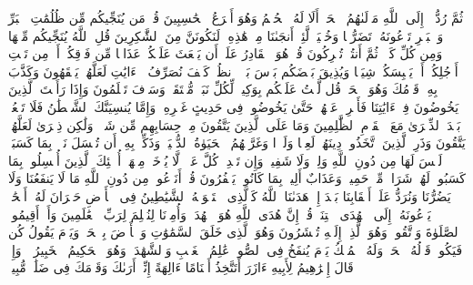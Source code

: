 \startbuffer[\q:6:62]
ثُمَّ رُدُّوۤا۟ إِلَى ٱللَّهِ مَوۡلَىٰهُمُ ٱلۡحَقِّۚ أَلَا لَهُ ٱلۡحُكۡمُ وَهُوَ أَسۡرَعُ ٱلۡحَٰسِبِینَ%
\stopbuffer
\startbuffer[\q:6:63]
قُلۡ مَن یُنَجِّیكُم مِّن ظُلُمَٰتِ ٱلۡبَرِّ وَٱلۡبَحۡرِ تَدۡعُونَهُۥ تَضَرُّعࣰا وَخُفۡیَةࣰ لَّئِنۡ أَنجَىٰنَا مِنۡ هَٰذِهِۦ لَنَكُونَنَّ مِنَ ٱلشَّٰكِرِینَ%
\stopbuffer
\startbuffer[\q:6:64]
قُلِ ٱللَّهُ یُنَجِّیكُم مِّنۡهَا وَمِن كُلِّ كَرۡبࣲ ثُمَّ أَنتُمۡ تُشۡرِكُونَ%
\stopbuffer
\startbuffer[\q:6:65]
قُلۡ هُوَ ٱلۡقَادِرُ عَلَىٰۤ أَن یَبۡعَثَ عَلَیۡكُمۡ عَذَابࣰا مِّن فَوۡقِكُمۡ أَوۡ مِن تَحۡتِ أَرۡجُلِكُمۡ أَوۡ یَلۡبِسَكُمۡ شِیَعࣰا وَیُذِیقَ بَعۡضَكُم بَأۡسَ بَعۡضٍۗ ٱنظُرۡ كَیۡفَ نُصَرِّفُ ٱلۡءَایَٰتِ لَعَلَّهُمۡ یَفۡقَهُونَ%
\stopbuffer
\startbuffer[\q:6:66]
وَكَذَّبَ بِهِۦ قَوۡمُكَ وَهُوَ ٱلۡحَقُّۚ قُل لَّسۡتُ عَلَیۡكُم بِوَكِیلࣲ%
\stopbuffer
\startbuffer[\q:6:67]
لِّكُلِّ نَبَإࣲ مُّسۡتَقَرࣱّۚ وَسَوۡفَ تَعۡلَمُونَ%
\stopbuffer
\startbuffer[\q:6:68]
وَإِذَا رَأَیۡتَ ٱلَّذِینَ یَخُوضُونَ فِیۤ ءَایَٰتِنَا فَأَعۡرِضۡ عَنۡهُمۡ حَتَّىٰ یَخُوضُوا۟ فِی حَدِیثٍ غَیۡرِهِۦۚ وَإِمَّا یُنسِیَنَّكَ ٱلشَّیۡطَٰنُ فَلَا تَقۡعُدۡ بَعۡدَ ٱلذِّكۡرَىٰ مَعَ ٱلۡقَوۡمِ ٱلظَّٰلِمِینَ%
\stopbuffer
\startbuffer[\q:6:69]
وَمَا عَلَى ٱلَّذِینَ یَتَّقُونَ مِنۡ حِسَابِهِم مِّن شَیۡءࣲ وَلَٰكِن ذِكۡرَىٰ لَعَلَّهُمۡ یَتَّقُونَ%
\stopbuffer
\startbuffer[\q:6:70]
وَذَرِ ٱلَّذِینَ ٱتَّخَذُوا۟ دِینَهُمۡ لَعِبࣰا وَلَهۡوࣰا وَغَرَّتۡهُمُ ٱلۡحَیَوٰةُ ٱلدُّنۡیَاۚ وَذَكِّرۡ بِهِۦۤ أَن تُبۡسَلَ نَفۡسُۢ بِمَا كَسَبَتۡ لَیۡسَ لَهَا مِن دُونِ ٱللَّهِ وَلِیࣱّ وَلَا شَفِیعࣱ وَإِن تَعۡدِلۡ كُلَّ عَدۡلࣲ لَّا یُؤۡخَذۡ مِنۡهَاۤۗ أُو۟لَٰۤئِكَ ٱلَّذِینَ أُبۡسِلُوا۟ بِمَا كَسَبُوا۟ۖ لَهُمۡ شَرَابࣱ مِّنۡ حَمِیمࣲ وَعَذَابٌ أَلِیمُۢ بِمَا كَانُوا۟ یَكۡفُرُونَ%
\stopbuffer
\startbuffer[\q:6:71]
قُلۡ أَنَدۡعُوا۟ مِن دُونِ ٱللَّهِ مَا لَا یَنفَعُنَا وَلَا یَضُرُّنَا وَنُرَدُّ عَلَىٰۤ أَعۡقَابِنَا بَعۡدَ إِذۡ هَدَىٰنَا ٱللَّهُ كَٱلَّذِی ٱسۡتَهۡوَتۡهُ ٱلشَّیَٰطِینُ فِی ٱلۡأَرۡضِ حَیۡرَانَ لَهُۥۤ أَصۡحَٰبࣱ یَدۡعُونَهُۥۤ إِلَى ٱلۡهُدَى ٱئۡتِنَاۗ قُلۡ إِنَّ هُدَى ٱللَّهِ هُوَ ٱلۡهُدَىٰۖ وَأُمِرۡنَا لِنُسۡلِمَ لِرَبِّ ٱلۡعَٰلَمِینَ%
\stopbuffer
\startbuffer[\q:6:72]
وَأَنۡ أَقِیمُوا۟ ٱلصَّلَوٰةَ وَٱتَّقُوهُۚ وَهُوَ ٱلَّذِیۤ إِلَیۡهِ تُحۡشَرُونَ%
\stopbuffer
\startbuffer[\q:6:73]
وَهُوَ ٱلَّذِی خَلَقَ ٱلسَّمَٰوَٰتِ وَٱلۡأَرۡضَ بِٱلۡحَقِّۖ وَیَوۡمَ یَقُولُ كُن فَیَكُونُۚ قَوۡلُهُ ٱلۡحَقُّۚ وَلَهُ ٱلۡمُلۡكُ یَوۡمَ یُنفَخُ فِی ٱلصُّورِۚ عَٰلِمُ ٱلۡغَیۡبِ وَٱلشَّهَٰدَةِۚ وَهُوَ ٱلۡحَكِیمُ ٱلۡخَبِیرُ%
\stopbuffer
\startbuffer[\q:6:74]
۞ وَإِذۡ قَالَ إِبۡرَٰهِیمُ لِأَبِیهِ ءَازَرَ أَتَتَّخِذُ أَصۡنَامًا ءَالِهَةً إِنِّیۤ أَرَىٰكَ وَقَوۡمَكَ فِی ضَلَٰلࣲ مُّبِینࣲ%
\stopbuffer
